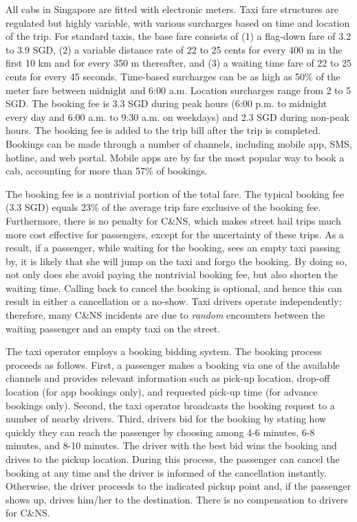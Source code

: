\documentclass[reviewmode,AEJ]{AEA}
\begin{document}
All cabs in Singapore are fitted with electronic meters. Taxi fare structures are regulated but 
highly variable, with various surcharges based on time and location of the trip. 
For standard taxis, the base fare consists of (1) a flag-down fare of 3.2 to 3.9 SGD, 
(2) a variable distance rate of 22 to 25 cents for every 400 m in the first 10 km and for every 350 m thereafter, 
and (3) a waiting time fare of 22 to 25 cents for every 45 seconds. Time-based surcharges can be as high as 50\% 
of the meter fare between midnight and 6:00 a.m. Location surcharges range from 2 to 5 SGD. 
The booking fee is 3.3 SGD during peak hours (6:00 p.m. to midnight every day and 6:00 a.m. to 9:30 a.m. 
on weekdays) and 2.3 SGD during non-peak hours.
The booking fee is added to the trip bill after the trip is completed. 
Bookings can be made through a number of channels, including mobile app, SMS, hotline, and web portal.
Mobile apps are by far the most popular way to book a cab, accounting for more than 57\% of bookings.

The booking fee is a nontrivial portion of the total fare. The typical booking fee (3.3 SGD) equals 
23\% of the average trip fare exclusive of the booking fee. Furthermore, there is no penalty for C\&NS, which makes street hail trips 
much more cost effective for passengers, except for the uncertainty of these trips. 
As a result, if a passenger, while waiting for the booking, sees an empty taxi passing by, 
it is likely that she will jump on the taxi and forgo the booking. By doing so, not only does she avoid
paying the nontrivial booking fee, but also shorten the waiting time. Calling back to cancel the booking is optional,
and hence this can result in either a cancellation or a no-show. Taxi drivers operate independently; 
therefore, many C\&NS incidents are due to \textit{random} encounters between the waiting passenger and an
empty taxi on the street.

The taxi operator employs a booking bidding system. The booking process proceeds as follows. 
First, a passenger makes a booking via one of the available channels and provides relevant information 
such as pick-up location, drop-off location (for app bookings only), and requested pick-up time 
(for advance bookings only). Second, the taxi operator broadcasts the booking request to a number of 
nearby drivers. Third, drivers bid for the booking by stating how quickly they can reach the passenger 
by choosing among 4-6 minutes, 6-8 minutes, and 8-10 minutes. The driver with the best bid wins the
booking and drives to the pickup location. During this process, the passenger can cancel the booking
at any time and the driver is informed of the cancellation instantly. Otherwise, the driver proceeds
to the indicated pickup point and, if the passenger shows up, drives him/her to the destination. 
There is no compensation to drivers for C\&NS.
\end{document}
